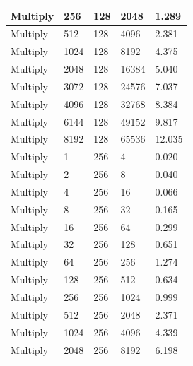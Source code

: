 \documentclass{article}
\begin{document}
\begin{longtable}{|l|l|l|l|l|}
Multiply           & 256  & 128         & 2048              & 1.289             \\ \hline
Multiply           & 512  & 128         & 4096              & 2.381             \\ \hline
Multiply           & 1024 & 128         & 8192              & 4.375             \\ \hline
Multiply           & 2048 & 128         & 16384             & 5.040             \\ \hline
Multiply           & 3072 & 128         & 24576             & 7.037             \\ \hline
Multiply           & 4096 & 128         & 32768             & 8.384             \\ \hline
Multiply           & 6144 & 128         & 49152             & 9.817             \\ \hline
Multiply           & 8192 & 128         & 65536             & 12.035            \\ \hline
Multiply           & 1    & 256         & 4                 & 0.020             \\ \hline
Multiply           & 2    & 256         & 8                 & 0.040             \\ \hline
Multiply           & 4    & 256         & 16                & 0.066             \\ \hline
Multiply           & 8    & 256         & 32                & 0.165             \\ \hline
Multiply           & 16   & 256         & 64                & 0.299             \\ \hline
Multiply           & 32   & 256         & 128               & 0.651             \\ \hline
Multiply           & 64   & 256         & 256               & 1.274             \\ \hline
Multiply           & 128  & 256         & 512               & 0.634             \\ \hline
Multiply           & 256  & 256         & 1024              & 0.999             \\ \hline
Multiply           & 512  & 256         & 2048              & 2.371             \\ \hline
Multiply           & 1024 & 256         & 4096              & 4.339             \\ \hline
Multiply           & 2048 & 256         & 8192              & 6.198             \\ \hline

\end{longtable}
\end{document}

